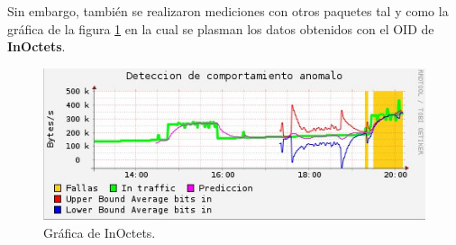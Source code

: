 Sin embargo, también se realizaron mediciones con otros paquetes tal y como la gráfica de la figura \ref{image:grafica3} en la cual se plasman los datos obtenidos con el OID de \textbf{InOctets}.
\FloatBarrier
\begin{figure}[htbp!]
		\centering
			\includegraphics[width=.7 \textwidth]{images/grafica3}
		\caption{Gráfica de InOctets.}
		\label{image:grafica3}
\end{figure}
\FloatBarrier

